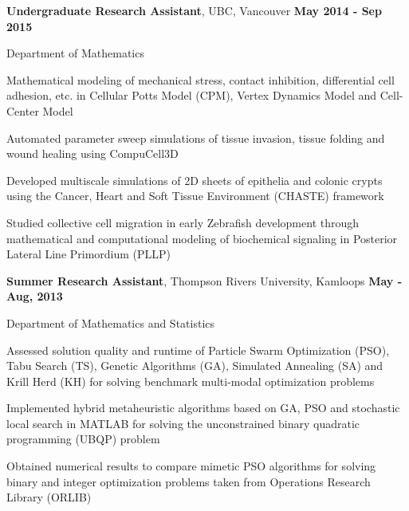 \documentclass[margin,line]{res}
\newenvironment{list1}{
  \begin{list}{\ding{113}}{
      \setlength{\itemsep}{0in}
      \setlength{\parsep}{0in} \setlength{\parskip}{0in}
      \setlength{\topsep}{0in} \setlength{\partopsep}{0in} 
      \setlength{\leftmargin}{0.17in}}}{\end{list}}
\newenvironment{list3}{
  \begin{list}{\textopenbullet}{
      \setlength{\itemsep}{0in}
      \setlength{\parsep}{0in} \setlength{\parskip}{0in}
      \setlength{\topsep}{0in} \setlength{\partopsep}{0in} 
      \setlength{\leftmargin}{0.1in}}}{\end{list}}
\begin{document}
\begin{resume}
{\bf Undergraduate Research Assistant}, UBC, Vancouver \hfill {\bf May 2014 - Sep 2015}\\
\vspace*{-.2cm}
\begin{list1}
\item[] Department of Mathematics
\vspace*{.1cm}
\begin{list3}
\item Mathematical modeling of mechanical stress, contact inhibition, differential cell adhesion, etc. in Cellular Potts Model (CPM), Vertex Dynamics Model and Cell-Center Model
\item Automated parameter sweep simulations of tissue invasion, tissue folding and wound healing using CompuCell3D
\item Developed multiscale simulations of 2{\textendash}D sheets of epithelia and colonic crypts using the Cancer, Heart and Soft Tissue Environment (CHASTE) framework
\item Studied collective cell migration in early Zebrafish development through mathematical and computational modeling of biochemical signaling in Posterior Lateral Line Primordium (PLLP)
\end{list3}
\end{list1}
\vspace*{.2cm}

{\bf Summer Research Assistant}, Thompson Rivers University, Kamloops \hfill {\bf May - Aug, 2013}\\
\vspace*{-.2cm}
\begin{list1}
\item[] Department of Mathematics and Statistics
\vspace*{.1cm}
\begin{list3}
\item Assessed solution quality and runtime of Particle Swarm Optimization (PSO), Tabu Search (TS), Genetic Algorithms (GA), Simulated Annealing (SA) and Krill Herd (KH) for solving benchmark multi-modal optimization problems
\item Implemented hybrid metaheuristic algorithms based on GA, PSO and stochastic local search in MATLAB for solving the unconstrained binary quadratic programming (UBQP) problem
\item Obtained numerical results to compare mimetic PSO algorithms for solving binary and integer optimization problems taken from Operations Research Library (ORLIB)
\end{list3}
\end{list1}


\end{resume}
\end{document}
